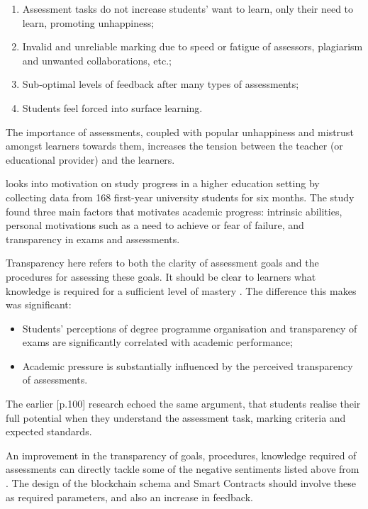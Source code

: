\begin{enumerate}
	\setlength\itemsep{0em}
	\item Assessment tasks do not increase students' want to learn, only their need to learn, promoting unhappiness;
	\item Invalid and unreliable marking due to speed or fatigue of assessors, plagiarism and unwanted collaborations, etc.;
	\item Sub-optimal levels of feedback after many types of assessments;
	\item Students feel forced into surface learning.\\
	      \citep[p.62-65]{brown1999assessment}
\end{enumerate}

The importance of assessments, coupled with popular unhappiness and mistrust amongst learners towards
them, increases the tension between the teacher (or educational provider) and the learners.

\citet{suhre2013determinants} looks into motivation on study progress in a higher education setting by collecting data
from 168 first-year university students for six months. The study found three main factors that motivates academic
progress: intrinsic abilities, personal motivations such as a need to achieve or fear of failure, and transparency in
exams and assessments.

Transparency here refers to both the clarity of assessment goals and the procedures for assessing these goals.
It should be clear to learners what knowledge is required for a sufficient level of mastery \citep{suhre2013determinants}.
The difference this makes was significant:

\begin{itemize}
	\setlength\itemsep{0em}
	\item Students' perceptions of degree programme organisation and transparency of exams are
	      significantly correlated with academic performance;
	\item Academic pressure is substantially influenced by the perceived transparency of assessments.
\end{itemize}

The earlier [p.100]\citet{bryan2006innovative} research echoed the same argument, that students realise their full potential
when they understand the assessment task, marking criteria and expected standards.

An improvement in the transparency of goals, procedures, knowledge required of assessments 
can directly tackle some of the negative sentiments listed above from \citet{brown1999assessment}. 
The design of the blockchain schema and Smart Contracts should involve these as required parameters, and also an increase
in feedback.

